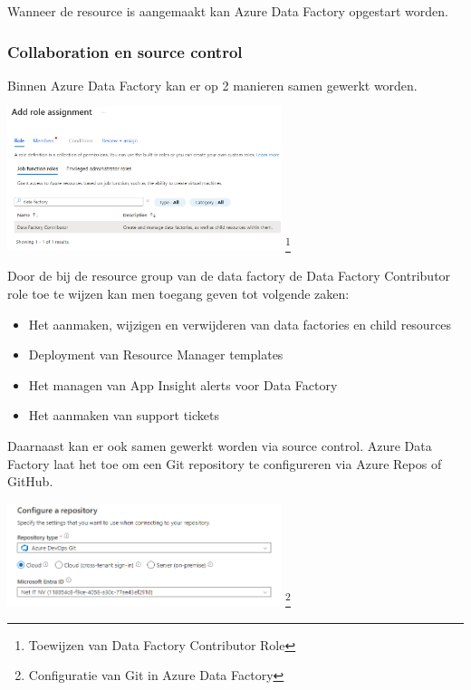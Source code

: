Wanneer de resource is aangemaakt kan Azure Data Factory opgestart worden.

\subsubsection{Collaboration en source control}

Binnen Azure Data Factory kan er op 2 manieren samen gewerkt worden. 

\begin{center}
    \includegraphics[width=0.6\textwidth]{./graphics/adf/adf_contributor.png}
    \footnote{Toewijzen van Data Factory Contributor Role}
\end{center}

Door de bij de resource group van de data factory de Data Factory Contributor role toe te wijzen kan men toegang geven tot volgende zaken:
\begin{itemize}
    \item Het aanmaken, wijzigen en verwijderen van data factories en child resources
    \item Deployment van Resource Manager templates
    \item Het managen van App Insight alerts voor Data Factory
    \item Het aanmaken van support tickets
\end{itemize}

Daarnaast kan er ook samen gewerkt worden via source control. Azure Data Factory laat het toe om een Git repository te configureren via Azure Repos of GitHub. 

\begin{center}
    \includegraphics[width=0.6\textwidth]{./graphics/adf/setup_repository_2_specific.png}
    \footnote{Configuratie van Git in Azure Data Factory}
\end{center}

